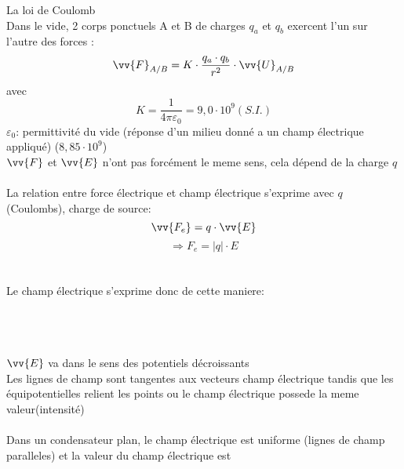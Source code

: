 \documentclass[../MAIN/main.tex]{subfiles}
\begin{document}
\begin{Definition}
La loi de Coulomb\\
Dans le vide, 2 corps ponctuels A et B de charges $q_{a}$ et $q_{b}$ exercent l'un sur l'autre des forces : \\
$$ \vv{F}_{A/B} = K \cdot \dfrac{q_{a}\cdot q_{b}}{r^2} \cdot \vv{U}_{A/B} $$
avec\\
$$K=\dfrac{1}{4\pi\varepsilon_{0}}= 9,0\cdot 10^9(S.I.)$$
$\varepsilon_{0}$: permittivité du vide (réponse d'un milieu donné a un champ électrique appliqué) ($8,85\cdot 10^9$)\\
\danger[5ex] \qquad $\vv{F}$ et $\vv{E}$ n'ont pas forcément le meme sens, cela dépend de la charge $q$\\\\

La relation entre force électrique et champ électrique s'exprime avec $q$ (Coulombs), charge de source:
$$\vv{F_{e}}=q\cdot \vv{E}$$
$$\Rightarrow F_{e}=|q|\cdot E$$\\\\
Le champ électrique s'exprime donc de cette maniere:\\\\
\\\\
$\vv{E}$ va dans le sens des potentiels décroissants\\
Les lignes de champ sont tangentes aux vecteurs champ électrique tandis que les équipotentielles relient les points ou le champ électrique possede la meme valeur(intensité) \\\\
Dans un condensateur plan, le champ électrique est uniforme (lignes de champ paralleles) et la valeur du champ électrique est\\
\end{Definition}
\end{document}
